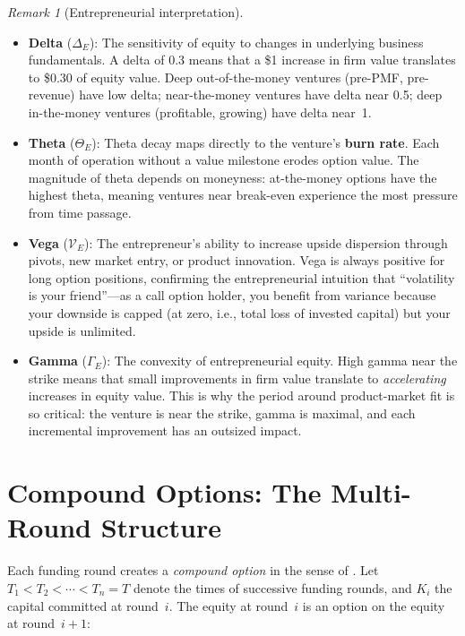 \documentclass[12pt,a4paper,oneside]{book}
\theoremstyle{definition}
\theoremstyle{remark}
\newtheorem{remark}[theorem]{Remark}
\begin{document}
\begin{remark}[Entrepreneurial interpretation]\quad
\begin{itemize}[nosep]
  \item \textbf{Delta} ($\Delta_E$): The sensitivity of equity to changes in underlying
    business fundamentals. A delta of 0.3 means that a \$1 increase in firm value
    translates to \$0.30 of equity value. Deep out-of-the-money ventures (pre-PMF,
    pre-revenue) have low delta; near-the-money ventures have delta near 0.5; deep
    in-the-money ventures (profitable, growing) have delta near~1.
  \item \textbf{Theta} ($\Theta_E$): Theta decay maps directly to the venture's
    \textbf{burn rate}. Each month of operation without a value milestone erodes option
    value. The magnitude of theta depends on moneyness: at-the-money options have the
    highest theta, meaning ventures near break-even experience the most pressure from
    time passage.
  \item \textbf{Vega} ($\mathcal{V}_E$): The entrepreneur's ability to increase upside
    dispersion through pivots, new market entry, or product innovation. Vega is always
    positive for long option positions, confirming the entrepreneurial intuition that
    ``volatility is your friend''---as a call option holder, you benefit from variance
    because your downside is capped (at zero, i.e., total loss of invested capital) but
    your upside is unlimited.
  \item \textbf{Gamma} ($\Gamma_E$): The convexity of entrepreneurial equity. High gamma
    near the strike means that small improvements in firm value translate to
    \emph{accelerating} increases in equity value. This is why the period around
    product-market fit is so critical: the venture is near the strike, gamma is maximal,
    and each incremental improvement has an outsized impact.
\end{itemize}
\end{remark}

\section{Compound Options: The Multi-Round Structure}\label{sec:compound}

Each funding round creates a \emph{compound option} in the sense of
\citet{Geske1979}. Let $T_1 < T_2 < \cdots < T_n = T$ denote the times of
successive funding rounds, and $K_i$ the capital committed at round~$i$.
The equity at round~$i$ is an option on the equity at round~$i+1$:
\end{document}
